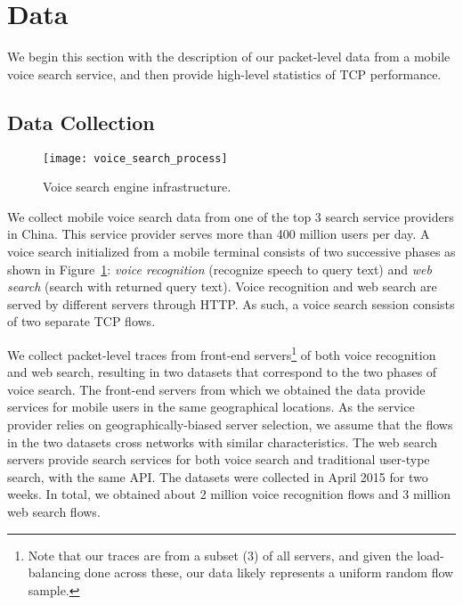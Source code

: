 
\section{Data}
\label{sec:dataset}

We begin this section with the description of our packet-level data from a mobile voice search service, and then provide high-level statistics of TCP performance. 

\subsection{Data Collection}

\begin{figure}[t]
	\centering
	\texttt{[image: voice\_search\_process]}
	\caption{Voice search engine infrastructure.}
	\label{fig:voice_search}
	\minsqueeze
\end{figure}

We collect mobile voice search data from one of the top 3 search service providers in China. This service provider serves more than 400 million users per day. A voice search initialized from a mobile terminal consists of two successive phases as shown in Figure~\ref{fig:voice_search}: \emph{voice recognition} (\ie recognize speech to query text) and \emph{web search} (\ie search with returned query text). Voice recognition and web search are served by different servers through HTTP. As such, a voice search session consists of two separate TCP flows.

We collect packet-level traces from front-end servers\footnote{Note that our traces are from a subset (3) of all servers, and given the load-balancing done across these, our data likely represents a uniform random flow sample.} of both voice recognition and web search, resulting in two datasets that correspond to the two phases of voice search. The front-end servers from which we obtained the data provide services for mobile users in the same geographical locations. As the service provider relies on geographically-biased server selection, we assume that the flows in the two datasets cross networks with similar characteristics. The web search servers provide search services for both voice search and traditional user-type search, with the same API. The datasets were collected in April 2015 for two weeks. In total, we obtained about 2 million voice recognition flows and 3 million web search flows.


